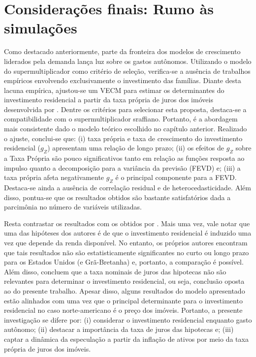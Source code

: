 \section{Considerações finais: Rumo às simulações}
\label{Conclucao_Empirica}


Como destacado anteriormente, parte da fronteira dos modelos de crescimento liderados pela demanda lança luz sobre os gastos autônomos. Utilizando o modelo do supermultiplicador como critério de seleção, verifica-se a ausência de trabalhos empíricos envolvendo exclusivamente o investimento das famílias. 
Diante desta lacuna empírica, ajustou-se um VECM para estimar os determinantes do investimento residencial a partir da taxa própria de juros dos imóveis desenvolvida por \textcite{teixeira_crescimento_2015}. Dentre os critérios para selecionar esta proposta, destaca-se a compatibilidade com o supermultiplicador sraffiano. Portanto, é a abordagem mais consistente dado o modelo teórico escolhido no capítulo anterior. Realizado o ajuste, conclui-se que: 
(i) taxa própria e taxa de crescimento do investimento residencial ($g_Z$) apresentam uma relação de longo prazo; 
(ii) os efeitos de $g_Z$ sobre a Taxa Própria são pouco significativos tanto em relação as funções resposta ao impulso quanto a decomposição para a variância da previsão (FEVD) e;
(iii) a taxa própria afeta negativamente $g_Z$ é o principal componente para a FEVD. 
Destaca-se ainda a ausência de correlação residual e de heterocedasticidade. Além disso, pontua-se que os resultados obtidos são bastante satisfatórios dada a parcimônia no número de variáveis utilizadas.

Resta contrastar os resultados com os obtidos por \textcite{arestis_residential_2015}. Mais uma vez, vale notar que uma das hipóteses dos autores é de que o investimento residencial é induzido uma vez que depende da renda disponível. No entanto, os próprios autores encontram que tais resultados não são estatisticamente significantes no curto ou longo prazo para os Estados Unidos (e Grã-Bretanha) e, portanto, a comparação é possível. Além disso, concluem que a taxa nominais de juros das hipotecas não são relevantes para determinar o investimento residencial, ou seja, conclusão oposta ao do presente trabalho. Apesar disso, alguns resultados do modelo apresentado estão alinhados com \textcite{arestis_residential_2015} uma vez que o principal determinante para o investimento residencial no caso norte-americano é o preço dos imóveis. Portanto, a presente investigação se difere por: (i) considerar o investimento residencial enquanto gasto autônomo; (ii) destacar a importância da taxa de juros das hipotecas e; (iii) captar a dinâmica da especulação a partir da inflação de ativos por meio da taxa própria de juros dos imóveis.  


